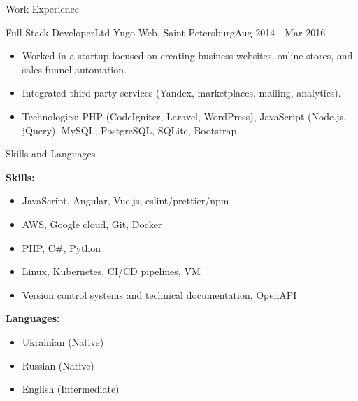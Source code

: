 \documentclass[]{mcdowellcv}
\begin{document}
\begin{cvsection}{Work Experience}
    \begin{cvsubsection}{Full Stack Developer}{Ltd Yugo-Web, Saint Petersburg}{Aug 2014 - Mar 2016}
        \begin{itemize}
            \item Worked in a startup focused on creating business websites, online stores, and sales funnel automation.
            \item Integrated third-party services (Yandex, marketplaces, mailing, analytics).
            \item Technologies: PHP (CodeIgniter, Laravel, WordPress), JavaScript (Node.js, jQuery), MySQL, PostgreSQL, SQLite, Bootstrap.
        \end{itemize}
    \end{cvsubsection}
\end{cvsection}

\begin{cvsection}{Skills and Languages}
    \begin{cvsubsection}{}{}{}
        \begin{multicols}{2}
            \textbf{Skills:}
            \begin{itemize}
                \setlength{\leftmargin}{1em}
                \item JavaScript, Angular, Vue.js, eslint/prettier/npm
                \item AWS, Google cloud, Git, Docker
                \item PHP, C\#, Python
                \item Linux, Kubernetes, CI/CD pipelines, VM
                \item Version control systems and technical documentation, OpenAPI
            \end{itemize}
            
            \columnbreak
            
            \textbf{Languages:}
            \begin{itemize}
                \item Ukrainian (Native)
                \item Russian (Native)
                \item English (Intermediate)
            \end{itemize}
        \end{multicols}
    \end{cvsubsection}
\end{cvsection}
\end{document}
